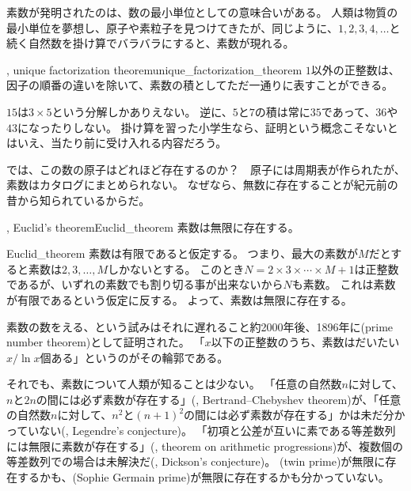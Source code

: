 素数が発明されたのは、数の最小単位としての意味合いがある。
人類は物質の最小単位を夢想し、原子や素粒子を見つけてきたが、同じように、$1,2,3,4,\ldots$と続く自然数を掛け算でバラバラにすると、素数が現れる。

\begin{Theo}{, unique factorization theorem}{unique_factorization_theorem}
$1$以外の正整数は、因子の順番の違いを除いて、素数の積としてただ一通りに表すことができる。
\end{Theo}

$15$は$3\times5$という分解しかありえない。
逆に、$5$と$7$の積は常に$35$であって、$36$や$43$になったりしない。
掛け算を習った小学生なら、証明という概念こそないとはいえ、当たり前に受け入れる内容だろう。

では、この数の原子はどれほど存在するのか？　原子には周期表が作られたが、素数はカタログにまとめられない。
なぜなら、無数に存在することが紀元前の昔から知られているからだ。

\begin{Theo}{, Euclid's theorem}{Euclid_theorem}
素数は無限に存在する。
\end{Theo}

\begin{thProof}{Euclid_theorem}
素数は有限であると仮定する。
つまり、最大の素数が$M$だとすると素数は$2,3,\ldots,M$しかないとする。
このとき$N=2\times3\times\cdots\times{M}+1$は正整数であるが、いずれの素数でも割り切る事が出来ないから$N$も素数。
これは素数が有限であるという仮定に反する。
よって、素数は無限に存在する。
\end{thProof}

素数の数をえる、という試みはそれに遅れること約2000年後、1896年に(prime number theorem)として証明された。
「$x$以下の正整数のうち、素数はだいたい$x/\ln x$個ある」というのがその輪郭である。

それでも、素数について人類が知ることは少ない。
「任意の自然数$n$に対して、$n$と$2n$の間には必ず素数が存在する」(, Bertrand–Chebyshev theorem)が、「任意の自然数$n$に対して、$n^2$と$(n+1)^2$の間には必ず素数が存在する」かは未だ分かっていない(, Legendre's conjecture)。
「初項と公差が互いに素である等差数列には無限に素数が存在する」(, theorem on arithmetic progressions)が、複数個の等差数列での場合は未解決だ(, Dickson's conjecture)。
(twin prime)が無限に存在するかも、(Sophie Germain prime)が無限に存在するかも分かっていない。

